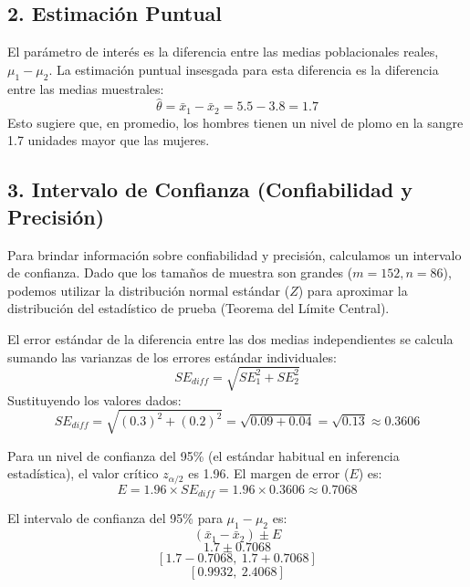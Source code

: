 \documentclass[12pt]{article}
\begin{document}
\subsection*{2. Estimación Puntual}
El parámetro de interés es la diferencia entre las medias poblacionales reales, $\mu_1 - \mu_2$. La estimación puntual insesgada para esta diferencia es la diferencia entre las medias muestrales:
$$ \hat{\theta} = \bar{x}_1 - \bar{x}_2 = 5.5 - 3.8 = 1.7 $$
Esto sugiere que, en promedio, los hombres tienen un nivel de plomo en la sangre 1.7 unidades mayor que las mujeres.

\subsection*{3. Intervalo de Confianza (Confiabilidad y Precisión)}
Para brindar información sobre confiabilidad y precisión, calculamos un intervalo de confianza. Dado que los tamaños de muestra son grandes ($m=152, n=86$), podemos utilizar la distribución normal estándar ($Z$) para aproximar la distribución del estadístico de prueba (Teorema del Límite Central).

El error estándar de la diferencia entre las dos medias independientes se calcula sumando las varianzas de los errores estándar individuales:
$$ SE_{diff} = \sqrt{SE_1^2 + SE_2^2} $$
Sustituyendo los valores dados:
$$ SE_{diff} = \sqrt{(0.3)^2 + (0.2)^2} = \sqrt{0.09 + 0.04} = \sqrt{0.13} \approx 0.3606 $$

Para un nivel de confianza del 95\% (el estándar habitual en inferencia estadística), el valor crítico $z_{\alpha/2}$ es 1.96. El margen de error ($E$) es:
$$ E = 1.96 \times SE_{diff} = 1.96 \times 0.3606 \approx 0.7068 $$

El intervalo de confianza del 95\% para $\mu_1 - \mu_2$ es:
$$ (\bar{x}_1 - \bar{x}_2) \pm E $$
$$ 1.7 \pm 0.7068 $$
$$ [1.7 - 0.7068, \ 1.7 + 0.7068] $$
$$ [0.9932, \ 2.4068] $$
\end{document}
